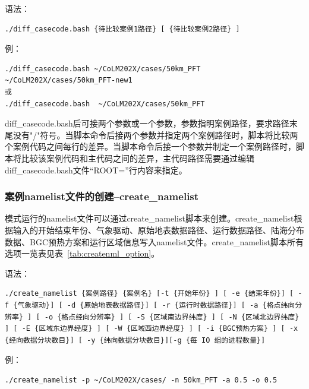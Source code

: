 语法：

\begin{lstlisting}
./diff_casecode.bash {待比较案例1路径} [ {待比较案例2路径} ]
\end{lstlisting}

例：
\begin{lstlisting}
./diff_casecode.bash ~/CoLM202X/cases/50km_PFT ~/CoLM202X/cases/50km_PFT-new1
或
./diff_casecode.bash  ~/CoLM202X/cases/50km_PFT
\end{lstlisting}

diff\_casecode.bash后可接两个参数或一个参数，参数指明案例路径，要求路径末尾没有"/"符号。当脚本命令后接两个参数并指定两个案例路径时，脚本将比较两个案例代码之间每行的差异。当脚本命令后接一个参数并制定一个案例路径时，脚本将比较该案例代码和主代码之间的差异，主代码路径需要通过编辑diff\_casecode.bash文件“ROOT=”行内容来指定。

\subsubsection{案例namelist文件的创建--create\_namelist}

模式运行的namelist文件可以通过create\_namelist脚本来创建。create\_namelist根据输入的开始结束年份、气象驱动、原始地表数据路径、运行数据路径、陆海分布数据、BGC预热方案和运行区域信息写入namelist文件。create\_namelist脚本所有选项一览表见表~\ref{tab:createnml_option}。

语法：
\begin{lstlisting}
./create_namelist {案例路径} {案例名} [-t {开始年份} ] [ -e {结束年份}] [ -f {气象驱动}] [ -d {原始地表数据路径}] [ -r {运行时数据路径}] [ -a {格点纬向分辨率} ] [ -o {格点经向分辨率} ] [ -S {区域南边界纬度} ] [ -N {区域北边界纬度} ] [ -E {区域东边界经度} ] [ -W {区域西边界经度} ] [ -i {BGC预热方案} ] [ -x {经向数据分块数目}] [ -y {纬向数据分块数目}][-g {每 IO 组的进程数量}]
\end{lstlisting}

例：
\begin{lstlisting}
./create_namelist -p ~/CoLM202X/cases/ -n 50km_PFT -a 0.5 -o 0.5
\end{lstlisting}


